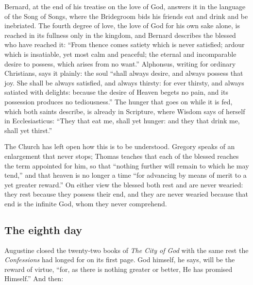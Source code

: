 Bernard, at the end of his treatise on the love of God, answers it in the language of the Song of Songs, where the Bridegroom bids his friends eat and drink and be inebriated. The fourth degree of love, the love of God for his own sake alone, is reached in its fullness only in the kingdom, and Bernard describes the blessed who have reached it: ``From thence comes satiety which is never satisfied; ardour which is insatiable, yet most calm and peaceful; the eternal and incomparable desire to possess, which arises from no want.'' Alphonsus, writing for ordinary Christians, says it plainly: the soul ``shall always desire, and always possess that joy. She shall be always satisfied, and always thirsty: for ever thirsty, and always satiated with delights: because the desire of Heaven begets no pain, and its possession produces no tediousness.'' The hunger that goes on while it is fed, which both saints describe, is already in Scripture, where Wisdom says of herself in Ecclesiasticus: ``They that eat me, shall yet hunger: and they that drink me, shall yet thirst.''

The Church has left open how this is to be understood. Gregory speaks of an enlargement that never stops; Thomas teaches that each of the blessed reaches the term appointed for him, so that ``nothing further will remain to which he may tend,'' and that heaven is no longer a time ``for advancing by means of merit to a yet greater reward.'' On either view the blessed both rest and are never wearied: they rest because they possess their end, and they are never wearied because that end is the infinite God, whom they never comprehend.

\subsection{The eighth day}

Augustine closed the twenty-two books of \emph{The City of God} with the same rest the \emph{Confessions} had longed for on its first page. God himself, he says, will be the reward of virtue, ``for, as there is nothing greater or better, He has promised Himself.'' And then:

